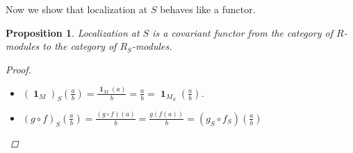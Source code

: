 \documentclass[a4paper]{article}
\DeclareMathOperator{\id}{\mathbf{1}}
\theoremstyle{mystyle}
\newtheorem{prop}{Proposition}
\begin{document}
Now we show that localization at $S$ behaves like a functor.
\begin{prop}
  Localization at $S$ is a covariant functor from the category of $R$-modules
  to the category of $R_S$-modules.
  \begin{proof}
    $ $
    \begin{itemize}
      \item
        $(\id_M)_S (\frac{a}{b}) = \frac{\id_M(a)}{b} = \frac{a}{b}
        = \id_{M_S}(\frac{a}{b})$.
        
      \item
        $(g \circ f)_S(\frac{a}{b}) = \frac{(g \circ f)(a)}{b} 
        = \frac{g(f(a))}{b} = (g_S \circ f_S)(\frac{a}{b})$
    \end{itemize}
  \end{proof}
\end{prop}
\end{document}
